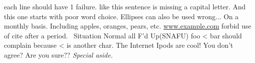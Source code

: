 \documentclass[12pt]{article}
\begin{document}
each line should have 1 failure. like this sentence is missing a capital letter.
And this one starts with poor word choice.
Ellipses can also be used wrong...
On a monthly basis. %
Including apples, oranges, pears, etc.
\url{www.example.com}
forbid use of cite after a period.~\cite{foo}
Situation Normal all F'd Up(SNAFU)
foo < bar should complain because < is another char. The
Internet
Ipods are cool!
You don't agree?
Are you sure??
{\em Special aside.}
\end{document}
